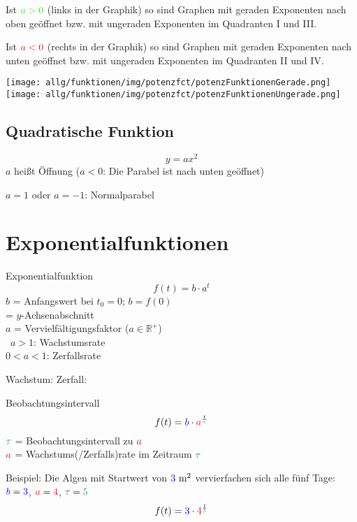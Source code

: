 \begin{multicols}{2}
Ist ${\color{green}a>0}$ (links in der Graphik) so sind Graphen mit
geraden Exponenten nach oben geöffnet bzw. mit ungeraden Exponenten im
Quadranten I und III.

Ist ${\color{red}a<0}$ (rechts in der Graphik) so sind Graphen mit
geraden Exponenten nach unten geöffnet bzw. mit ungeraden Exponenten
im Quadranten II und IV.

 \texttt{[image: allg/funktionen/img/potenzfct/potenzFunktionenGerade.png]}\hfill{}\texttt{[image: allg/funktionen/img/potenzfct/potenzFunktionenUngerade.png]}


\hrulefill  
\subsection*{Quadratische Funktion}
$$y=ax^2$$
$a$ heißt Öffnung ($a<0$: Die Parabel ist nach unten geöffnet)

$a=1$ oder $a=-1$: Normalparabel

\hrulefill
\section*{Exponentialfunktionen}
\begin{definition*}{Exponentialfunktion}{}
$$f(t) = b\cdot{}a^t$$
$b$ = Anfangswert bei $t_0=0$; $b=f(0)$\\
\phantom{$b$} = $y$-Achsenabschnitt\\
$a$ = Vervielfältigungsfaktor ($a\in\mathbb{R}^{+}$)\\\
$a>1$: Wachstumsrate\\
$0<a<1$: Zerfallsrate
\end{definition*}

Wachstum:
Zerfall:
\begin{rezept*}{Beobachtungsintervall}{}
$$f(t) = {\color{blue}b}\cdot{}{\color{red}a}^{\frac{t}{\color{ForestGreen}\tau}}$$
$\color{ForestGreen}\tau$ = Beobachtungsintervall zu $\color{red}a$\\
$\color{red}a$ = Wachstums(/Zerfalls)rate im Zeitraum $\color{ForestGreen}\tau$

Beispiel: Die Algen mit Startwert von ${\color{blue}3} \textrm{ m}^2$ ver{\color{red}vier}fachen
sich alle {\color{ForestGreen}fünf} Tage:\\
${\color{blue}b}={\color{blue}3}$, ${\color{red}a}={\color{red}4}$, ${\color{ForestGreen}\tau}={\color{ForestGreen}5}$
$$f(t)= {\color{blue}3}\cdot{}{\color{red}4}^\frac{t}{\color{ForestGreen}5}$$
\end{rezept*}



\end{multicols}
